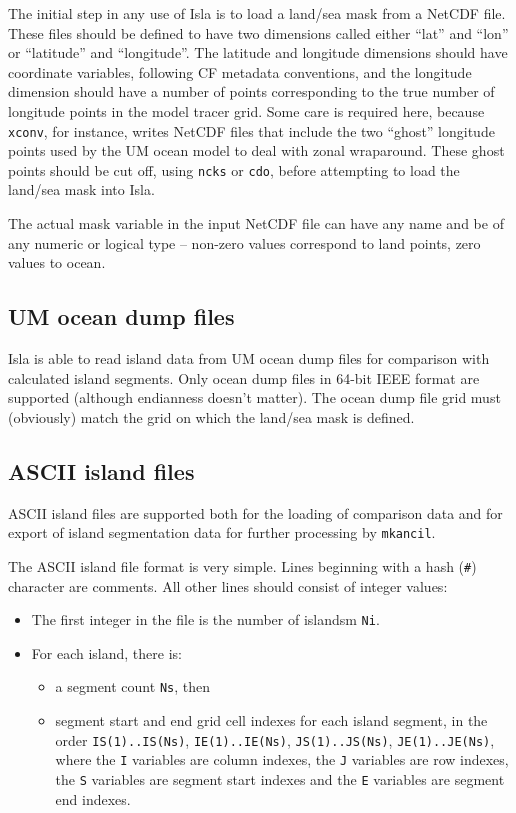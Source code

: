 \documentclass[11pt,makeidx,texhelp]{report}
\begin{document}
The initial step in any use of Isla is to load a land/sea mask from a
NetCDF file.  These files should be defined to have two dimensions
called either ``lat'' and ``lon'' or ``latitude'' and ``longitude''.
The latitude and longitude dimensions should have coordinate
variables, following CF metadata conventions, and the longitude
dimension should have a number of points corresponding to the true
number of longitude points in the model tracer grid.  Some care is
required here, because \texttt{xconv}, for instance, writes NetCDF
files that include the two ``ghost'' longitude points used by the UM
ocean model to deal with zonal wraparound.  These ghost points should
be cut off, using \texttt{ncks} or \texttt{cdo}, before attempting to
load the land/sea mask into Isla.

The actual mask variable in the input NetCDF file can have any name
and be of any numeric or logical type -- non-zero values correspond to
land points, zero values to ocean.

\subsection{UM ocean dump files}

Isla is able to read island data from UM ocean dump files for
comparison with calculated island segments.  Only ocean dump files in
64-bit IEEE format are supported (although endianness doesn't
matter).  The ocean dump file grid must (obviously) match the grid on
which the land/sea mask is defined.

\subsection{ASCII island files}

ASCII island files are supported both for the loading of comparison
data and for export of island segmentation data for further processing
by \texttt{mkancil}.

The ASCII island file format is very simple.  Lines beginning with a
hash (\texttt{\#}) character are comments.  All other lines should
consist of integer values:
\begin{itemize}
  \item{The first integer in the file is the number of islandsm
    \texttt{Ni}.}
  \item{For each island, there is:
    \begin{itemize}
      \item{a segment count \texttt{Ns}, then}
      \item{segment start and end grid cell indexes for each island
        segment, in the order \texttt{IS(1)..IS(Ns)},
        \texttt{IE(1)..IE(Ns)}, \texttt{JS(1)..JS(Ns)},
        \texttt{JE(1)..JE(Ns)}, where the \texttt{I} variables are
        column indexes, the \texttt{J} variables are row indexes, the
        \texttt{S} variables are segment start indexes and the
        \texttt{E} variables are segment end indexes.}
    \end{itemize}}
\end{itemize}
\end{document}
